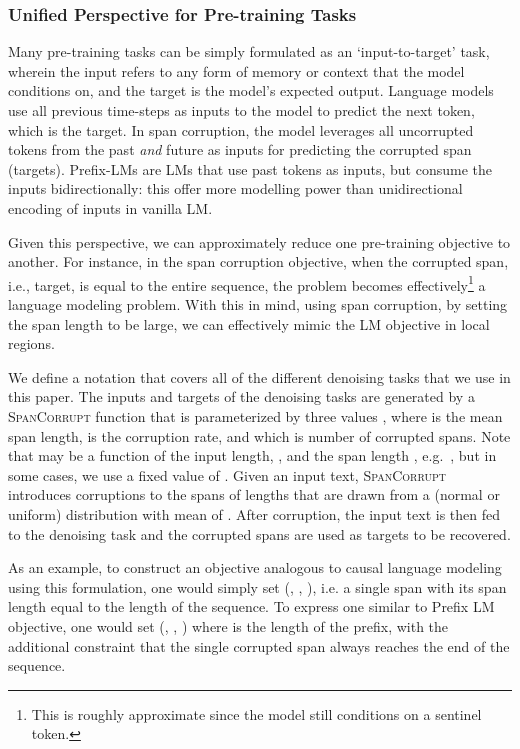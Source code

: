 \documentclass[10pt]{article}
\begin{document}
\subsubsection{Unified Perspective for Pre-training Tasks}
Many pre-training tasks can be simply formulated as an `input-to-target' task, wherein the input refers to any form of memory or context that the model conditions on, and the target is the model's expected output. Language models use all previous time-steps as inputs to the model to predict the next token, which is the target.  
In span corruption, the model leverages all uncorrupted tokens from the past \emph{and} future as inputs for predicting the corrupted span (targets).
Prefix-LMs are LMs that use past tokens as inputs, but consume the inputs bidirectionally: this offer more modelling power than unidirectional encoding of inputs in vanilla LM.

Given this perspective, we can approximately reduce one pre-training objective to another. For instance, in the span corruption objective, when the corrupted span, i.e., target, is equal to the entire sequence, the problem becomes effectively\footnote{This is roughly approximate since the model still conditions on a sentinel token.} a language modeling problem. With this in mind, using span corruption, by setting the span length to be large, we can effectively mimic the LM objective in local regions. 

We define a notation that covers all of the different denoising tasks that we use in this paper. The inputs and targets of the denoising tasks are generated by a \textsc{SpanCorrupt} function that is parameterized by three values , where  is the mean span length,  is the corruption rate, and  which is number of corrupted spans. Note that  may be a function of the input length, , and the span length , e.g.\ , but in some cases, we use a fixed value of . Given an input text, \textsc{SpanCorrupt} introduces corruptions to the spans of lengths that are drawn from a (normal or uniform) distribution with mean of . After corruption, the input text is then fed to the denoising task and the corrupted spans are used as targets to be recovered. 

As an example, to construct an objective analogous to causal language modeling using this formulation, one would simply set (, , ), i.e. a single span with its span length equal to the length of the sequence. To express one similar to Prefix LM objective, one would set (, , ) where  is the length of the prefix, with the additional constraint that the single corrupted span always reaches the end of the sequence. 
\end{document}
